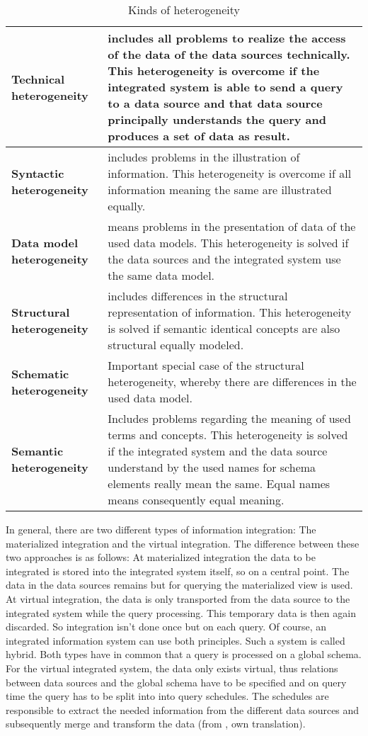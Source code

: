 \begin{table}[]
\centering
\caption{Kinds of heterogeneity}
\label{kinds-of-heterogeneity}
\begin{tabular}{|l|p{}|}
\hline
 \textbf{Technical  heterogeneity}  &  includes all problems to realize the access of the data of the data sources technically. This heterogeneity is overcome if the integrated system is able to send a query to a data source and that data source principally understands the query and produces a set of data as result.\\ \hline
 \textbf{Syntactic  heterogeneity}    &  includes problems in the illustration of information. This heterogeneity is overcome if all information meaning the same are illustrated equally.\\ \hline
 \textbf{Data model  heterogeneity} &  means problems in the presentation of data of the used data models. This heterogeneity is solved if the data sources and the integrated system use the same data model.\\ \hline
 \textbf{Structural  heterogeneity}    &  includes differences in the structural representation of information. This heterogeneity is solved if semantic identical concepts are also structural equally modeled. \\ \hline
 \textbf{Schematic  heterogeneity} &  Important special case of the structural heterogeneity, whereby there are differences in the used data model.\\ \hline
 \textbf{Semantic  heterogeneity}    &  Includes problems regarding the meaning of used terms and concepts. This heterogeneity is solved if the integrated system and the data source understand by the used names for schema elements really mean the same. Equal names means consequently equal meaning.\\ \hline
\end{tabular}
\end{table}

In general, there are two different types of information integration: The materialized integration and the virtual integration. The difference between these two approaches is as follows: At materialized integration the data to be integrated is stored  into the integrated system itself, so on a central point. The data in the data sources remains but for querying the materialized view is used. At virtual integration, the data is only transported from the data source to the integrated system while the query processing. This temporary data is then again discarded. So integration isn't done once but on each query. Of course, an integrated information system can use both principles. Such a system is called hybrid. Both types have in common that a query is processed on a global schema. For the virtual integrated system, the data only exists virtual, thus relations between data sources and the global schema have to be specified and on query time the query has to be split into into query schedules. The schedules are responsible to extract the needed information from the different data sources and subsequently merge and transform the data (from \cite[p. 86-88]{DBLP:books/dp/LeserN2006}, own translation).

